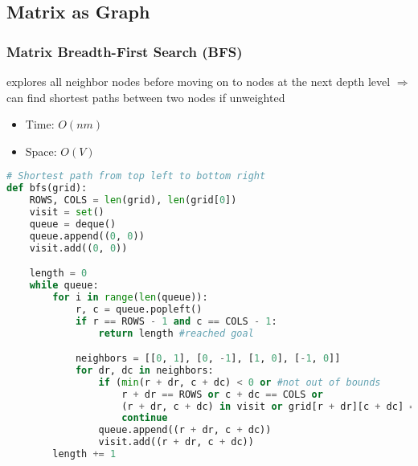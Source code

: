 \documentclass[english, threecolumn]{latex4ei/latex4ei_sheet}
\begin{document}
\begin{sectionbox}
\subsection{Matrix as Graph}
\subsubsection{Matrix Breadth-First Search (BFS)}
explores all neighbor nodes before moving on to nodes at the next depth level $\Rightarrow$ can find shortest paths between two nodes if unweighted
\begin{itemize}
    \item Time: $O(nm)$
    \item Space: $O(V)$
\end{itemize}
\begin{lstlisting}[language=python, gobble=0]
# Shortest path from top left to bottom right
def bfs(grid):
    ROWS, COLS = len(grid), len(grid[0])
    visit = set()
    queue = deque()
    queue.append((0, 0))
    visit.add((0, 0))

    length = 0
    while queue:
        for i in range(len(queue)):
            r, c = queue.popleft()
            if r == ROWS - 1 and c == COLS - 1:
                return length #reached goal

            neighbors = [[0, 1], [0, -1], [1, 0], [-1, 0]]
            for dr, dc in neighbors:
                if (min(r + dr, c + dc) < 0 or #not out of bounds
                    r + dr == ROWS or c + dc == COLS or
                    (r + dr, c + dc) in visit or grid[r + dr][c + dc] == 1): 
                    continue
                queue.append((r + dr, c + dc))
                visit.add((r + dr, c + dc))
        length += 1
\end{lstlisting}
\end{sectionbox}
\end{document}
